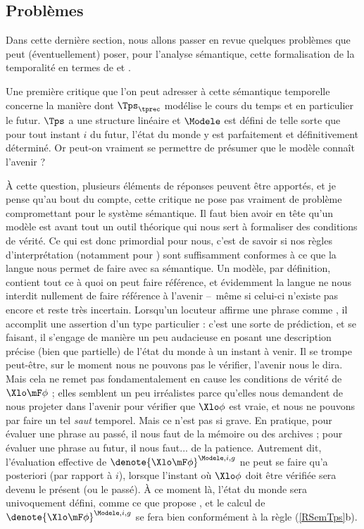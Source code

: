 


\subsection{Problèmes}
\label{ss:PbTmps}

Dans cette dernière section, nous allons passer en revue quelques problèmes que peut (éventuellement) poser, pour l'analyse sémantique, cette formalisation de la temporalité en termes de {\mP} et {\mF}. 


Une première critique que l'on peut adresser à cette sémantique temporelle concerne la manière dont $\Tps_{\tprec}$ modélise le cours du temps et en particulier le futur. $\Tps$ a une structure linéaire et $\Modele$ est défini de telle sorte que pour tout instant $i$ du futur, l'état du monde y est parfaitement et définitivement déterminé. Or peut-on vraiment se permettre de présumer que le modèle connaît l'avenir ? 

À cette question, plusieurs éléments de réponses peuvent être apportés, et je pense qu'au bout du compte, cette critique ne pose pas vraiment de problème compromettant pour le système sémantique. Il faut bien avoir en tête qu'un modèle est avant tout un outil théorique qui nous sert à formaliser des conditions de vérité.  Ce qui est donc primordial pour nous, c'est de savoir si nos règles d'interprétation (notamment pour \mF) sont suffisamment conformes à ce que la langue nous permet de faire avec sa sémantique.  Un modèle, par définition, contient tout ce à quoi on peut faire référence, et évidemment la langue ne nous interdit nullement de faire référence à l'avenir --~même si celui-ci n'existe pas encore et reste très incertain. Lorsqu'un locuteur affirme une phrase comme , il accomplit une assertion d'un type particulier : c'est une sorte de prédiction, et se faisant, il s'engage de manière un peu audacieuse en posant une description précise (bien que partielle) de l'état du monde à un instant à venir. Il se trompe peut-être, sur le moment nous ne pouvons pas le vérifier, l'avenir nous le dira. Mais cela ne remet pas fondamentalement en cause les conditions de vérité de $\Xlo\mF\phi$ ; elles semblent un peu irréalistes parce qu'elles nous demandent de nous projeter dans l'avenir pour vérifier que $\Xlo\phi$ est vraie, et nous ne pouvons par faire un tel \emph{saut} temporel. Mais ce n'est pas si grave. En pratique, pour évaluer une phrase au passé, il nous faut de la mémoire ou des archives ; pour évaluer une phrase au futur, il nous faut... de la patience. Autrement dit, l'évaluation effective de \(\denote{\Xlo\mF\phi}^{\Modele,i,g}\) ne peut se faire qu'a posteriori (par rapport à $i$), lorsque l'instant où $\Xlo\phi$ doit être vérifiée sera devenu le présent (ou le passé). À ce moment là, l'état du monde sera univoquement défini, comme ce que propose \Modele, et le calcul de \(\denote{\Xlo\mF\phi}^{\Modele,i,g}\) se fera bien conformément à la règle (\RSem\ref{RSemTps}b). 

